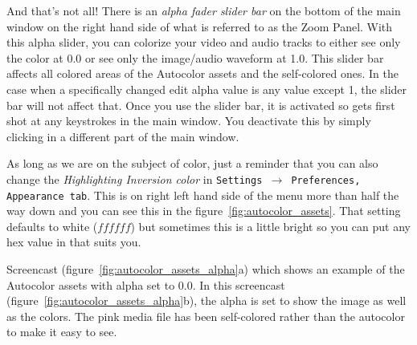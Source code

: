 And that’s not all!  
There is an \emph{alpha fader slider bar} on the bottom of the main window on the right hand side of what is referred to as the Zoom Panel.  
With this alpha slider, you can colorize your video and audio tracks to either see only the color at 0.0 or see only the image/audio waveform at 1.0.  
This slider bar affects all colored areas of the Autocolor assets and the self-colored ones.  
In the case when a specifically changed edit alpha value is any value except 1, the slider bar will not affect that.  
Once you use the slider bar, it is activated so gets first shot at any keystrokes in the main window.  
You deactivate this by simply clicking in a different part of the main window.  

As long as we are on the subject of color, just a reminder that you can also change the \textit{Highlighting Inversion color} in \texttt{Settings $\rightarrow$ Preferences, Appearance tab}.  
This is on right left hand side of the menu more than half the way down and you can see this in the figure~\ref{fig:autocolor_assets}.  
That setting defaults to white ($ffffff$) but sometimes this is a little bright so you can put any hex value in that suits you.

Screencast (figure~\ref{fig:autocolor_assets_alpha}a) which shows an example of the Autocolor assets with alpha set to 0.0.
In this screencast (figure~\ref{fig:autocolor_assets_alpha}b), the alpha is set to show the image as well as the colors.  The pink media file has been self-colored rather than the autocolor to make it easy to see.

